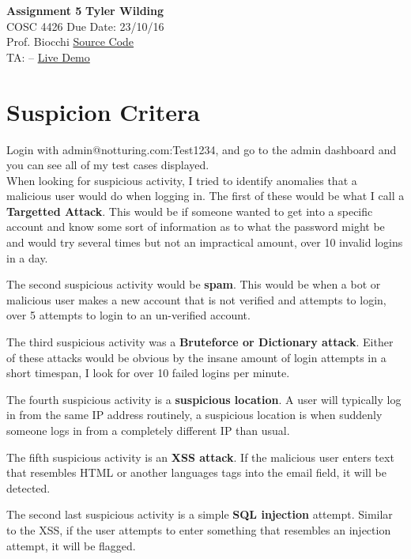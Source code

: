 \documentclass[a4paper, 11pt]{article}
\begin{document}
\noindent
\large\textbf{Assignment 5} \hfill \textbf{Tyler Wilding} \\
\normalsize COSC 4426 \hfill Due Date: 23/10/16 \\
Prof. Biocchi \hfill \href{https://github.com/xTVaser/Schoolwork-Fall-2016/tree/master/Internet%20Security/login-attempts}{Source Code} \\
TA: -- \hfill \href{https://notturing.ddns.net/tyler/IS_ASS5/form.php}{Live Demo}

\section*{Suspicion Critera}
Login with admin@notturing.com:Test1234, and go to the admin dashboard and you can see all of my test cases displayed. \\

When looking for suspicious activity, I tried to identify anomalies that a malicious user would do when logging in.  The first of these would be what I call a \textbf{Targetted Attack}.  This would be if someone wanted to get into a specific account and know some sort of information as to what the password might be and would try several times but not an impractical amount, over 10 invalid logins in a day.

The second suspicious activity would be \textbf{spam}.  This would be when a bot or malicious user makes a new account that is not verified and attempts to login, over 5 attempts to login to an un-verified account.

The third suspicious activity was a \textbf{Bruteforce or Dictionary attack}.  Either of these attacks would be obvious by the insane amount of login attempts in a short timespan, I look for over 10 failed logins per minute.

The fourth suspicious activity is a \textbf{suspicious location}.  A user will typically log in from the same IP address routinely, a suspicious location is when suddenly someone logs in from a completely different IP than usual.

The fifth suspicious activity is an \textbf{XSS attack}.  If the malicious user enters text that resembles HTML or another languages tags into the email field, it will be detected.

The second last suspicious activity is a simple \textbf{SQL injection} attempt.  Similar to the XSS, if the user attempts to enter something that resembles an injection attempt, it will be flagged.
\end{document}
